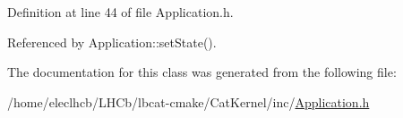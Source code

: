 Definition at line 44 of file Application.\+h.



Referenced by Application\+::set\+State().



The documentation for this class was generated from the following file\+:\begin{DoxyCompactItemize}
\item 
/home/eleclhcb/\+L\+H\+Cb/lbcat-\/cmake/\+Cat\+Kernel/inc/\hyperlink{Application_8h}{Application.\+h}\end{DoxyCompactItemize}
